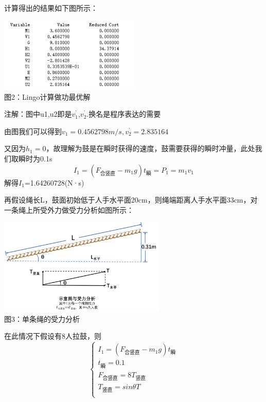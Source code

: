 \documentclass[UTF8]{article}
\begin{document}
计算得出的结果如下图所示：
\begin{center}
    \includegraphics[width=0.5\textwidth]{figure2.png}\\ 
    图2：Lingo计算做功最优解  
    
    注解：图中u1,u2即是$v_1^{\mbox{'}}$,$v_2^{\mbox{'}}$.换名是程序表达的需要
\end{center}

由图我们可以得到$v_1=0.4562798m/s,v_2^{\mbox{'}}=2.835164$

又因为$h_1=0$，故理解为鼓是在瞬时获得的速度，鼓需要获得的瞬时冲量，此处我们取瞬时为0.1s
\begin{equation}
    I_1=(F_{\mbox{合竖直}}-m_1g)t_{\mbox{瞬}}=P_1=m_1v_1
\end{equation}
解得$I_1$=1.64260728‬(N·s)

再假设绳长L，鼓面初始低于人手水平面20cm，则绳端距离人手水平面33cm，对一条绳上所受外力做受力分析如图所示：

\begin{center}
    \includegraphics[width=0.6\textwidth]{figure3.png}\\ 
    图3：单条绳的受力分析  
\end{center}

在此情况下假设有8人拉鼓，则
\begin{equation}
    \begin{cases}
        I_1=(F_{\mbox{合竖直}}-m_1g)t_{\mbox{瞬}}\\
        t_{\mbox{瞬}}=0.1\\
        F_{\mbox{合竖直}}=8T_{\mbox{竖直}}\\
        T_{\mbox{竖直}}=sin\theta T\\
    \end{cases}
\end{equation}
\end{document}
